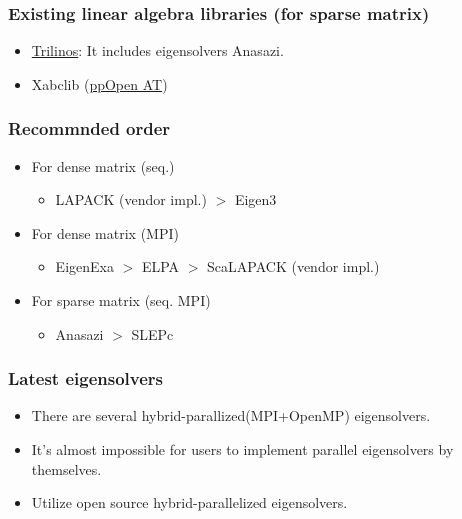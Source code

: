 \begin{frame}
  \frametitle{Existing linear algebra libraries (for sparse matrix)}
  \begin{itemize}
  \item \href{http://trilinos.org}{Trilinos}: It includes eigensolvers Anasazi.
  \item Xabclib (\href{http://ppopenhpc.cc.u-tokyo.ac.jp/}{ppOpen AT})
  \end{itemize}
\end{frame}

\begin{frame}
  \frametitle{Recommnded order}
  \begin{itemize}
  \item For dense matrix (seq.)
    \begin{itemize}
      \item LAPACK (vendor impl.) $>$ Eigen3
    \end{itemize}
  \item For dense matrix (MPI)
    \begin{itemize}
      \item EigenExa $>$ ELPA $>$ ScaLAPACK (vendor impl.) %
    \end{itemize}
  \item For sparse matrix (seq. MPI)
    \begin{itemize}
      \item Anasazi $>$ SLEPc
    \end{itemize}
  \end{itemize}
\end{frame}

\begin{frame}
  \frametitle{Latest eigensolvers}
  \begin{itemize}
    \setlength{\itemsep}{1em}
  \item There are several hybrid-parallized(MPI+OpenMP) eigensolvers.
  \item It's almost impossible for users to implement parallel eigensolvers by themselves.
  \item Utilize open source hybrid-parallelized eigensolvers.
  \end{itemize}
\end{frame}


